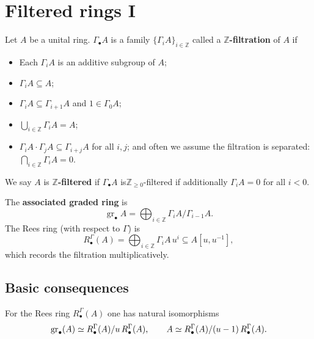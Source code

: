 \section{Filtered rings I}
\begin{definition}\label{def:z_filtration}
    Let $A$ be a unital ring. \(\Gamma_\bullet A\) is a family \(\{\Gamma_i A\}_{i\in\mathbb Z}\) called a \textbf{$\mathbb Z$-filtration} of $A$ if
    \begin{itemize}
        \item Each \(\Gamma_i A\) is an additive subgroup of \(A\);
        \item $\Gamma_i A \subseteq A$;
        \item $\Gamma_i A \subseteq \Gamma_{i+1} A$ and $1\in \Gamma_0 A$;
        \item $\bigcup_{i\in\mathbb Z} \Gamma_i A = A$;
        \item $\Gamma_i A\cdot \Gamma_j A \subseteq \Gamma_{i+j} A$ for all $i,j$; and often we assume the
              filtration is separated: $\bigcap_{i\in\mathbb Z}\Gamma_i A=0$.
    \end{itemize}
\end{definition}
We say $A$ is \textbf{$\mathbb Z$-filtered} if $\Gamma_\bullet A$ is$\mathbb Z_{\ge 0}$-filtered if additionally $\Gamma_i A=0$ for all $i<0$.

The \textbf{associated graded ring} is
\[
    \operatorname{gr}_\bullet A = \bigoplus_{i\in\mathbb Z} \Gamma_i A/\Gamma_{i-1} A.
\]
The Rees ring (with respect to $\Gamma$) is
\[
    R^{\Gamma}_\bullet(A) = \bigoplus_{i\in\mathbb Z} \Gamma_i A\,u^i \subseteq A[u,u^{-1}],
\]
which records the filtration multiplicatively.

\subsection*{Basic consequences}
\begin{lemma}\label{lem:rees-quotients}
    For the Rees ring $R^{\Gamma}_\bullet (A)$ one has natural isomorphisms
    \[
        \operatorname{gr}_\bullet (A) \simeq R^{\Gamma}_\bullet (A)/u\,R^{\Gamma}_\bullet (A),\qquad
        A \simeq R^{\Gamma}_\bullet (A)/(u-1)\,R^{\Gamma}_\bullet (A).
    \]
\end{lemma}

